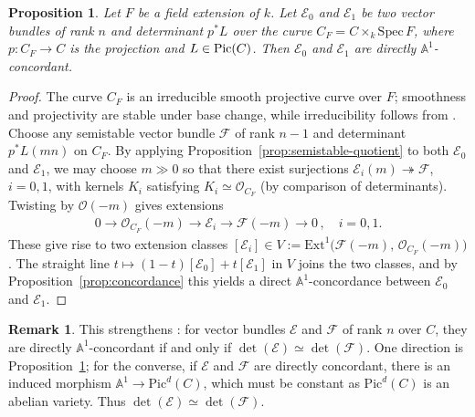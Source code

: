 \documentclass[12pt,reqno]{amsart}
\DeclareMathOperator{\Pic}{\textnormal{Pic}}
\newcommand{\mc}[1]{\mathcal{#1}}
\newcommand{\bb}[1]{\mathbb{#1}}
\newtheorem{proposition}[theorem]{Proposition}
\theoremstyle{definition}
\newtheorem{remark}[theorem]{Remark}
\numberwithin{equation}{section}
\begin{document}
	\begin{proposition}\label{prop:direct-concordance}
		Let $F$ be a field extension of $k$. Let $\mc{E}_0$ and $\mc{E}_1$ be two
		vector bundles of rank $n$ and determinant $p^*L$ over the curve
		$C_F = C\times_k \mathrm{Spec}\,F$, where $p: C_F \rightarrow C$ is the
		projection and $L\in \Pic(C)$. Then $\mc{E}_0$ and $\mc{E}_1$ are directly
		$\bb{A}^1$-concordant.
	\end{proposition}
	
	\begin{proof}
		The curve $C_F$ is an irreducible smooth projective curve over $F$;
		smoothness and projectivity are stable under base change, while
		irreducibility follows from \cite[$\mathrm{IV}_2$,~Proposition~4.5.9]{EGA}.
		Choose any semistable vector bundle $\mc{F}$ of rank $n-1$ and determinant
		$p^*L(mn)$ on $C_F$. By applying Proposition~\ref{prop:semistable-quotient}
		to both $\mc{E}_0$ and $\mc{E}_1$, we may choose $m\gg 0$ so that there
		exist surjections $\mc{E}_i(m) \twoheadrightarrow \mc{F}$, $i=0,1$, with
		kernels $K_i$ satisfying $K_i\simeq \mc{O}_{C_F}$ (by comparison of
		determinants). Twisting by $\mc{O}(-m)$ gives extensions
		\begin{align}\label{eqn:extension}
			0\longrightarrow \mc{O}_{C_F}(-m) \longrightarrow \mc{E}_i
			\longrightarrow \mc{F}(-m) \longrightarrow 0\,,\quad i=0,1.
		\end{align}
		These give rise to two extension classes
		$[\mc{E}_i]\in V := \mathrm{Ext}^1\bigl(\mc{F}(-m),\,\mc{O}_{C_F}(-m)\bigr)$.
		The straight line $t\mapsto (1-t)[\mc{E}_0]+t[\mc{E}_1]$ in $V$ joins the
		two classes, and by Proposition~\ref{prop:concordance} this yields a direct
		$\bb{A}^1$-concordance between $\mc{E}_0$ and $\mc{E}_1$.
	\end{proof}
	
	\begin{remark}
		This strengthens \cite[Theorem~2.5(b)]{HY24}: for vector bundles $\mathcal{E}$
		and $\mathcal{F}$ of rank $n$ over $C$, they are directly $\mathbb{A}^1$-concordant
		if and only if $\det(\mathcal{E}) \simeq \det(\mathcal{F})$. One direction is
		Proposition~\ref{prop:direct-concordance}; for the converse, if $\mathcal{E}$
		and $\mathcal{F}$ are directly concordant, there is an induced morphism
		$\mathbb{A}^1 \to \mathrm{Pic}^d(C)$, which must be constant as $\mathrm{Pic}^d(C)$
		is an abelian variety. Thus $\det(\mathcal{E}) \simeq \det(\mathcal{F})$.
	\end{remark}
	
\end{document}
